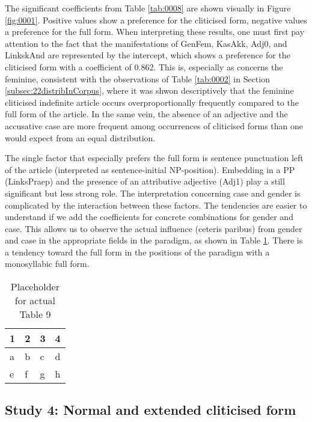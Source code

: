 The significant coefficients from Table \ref{tab:0008} are shown visually in Figure \ref{fig:0001}. 
Positive values show a preference for the cliticised form, negative values a preference for the full form.
When interpreting these results, one must first pay attention to the fact that the manifestations of GenFem, KasAkk, Adj0, and LinkskAnd are represented by the intercept, which shows a preference for the cliticised form with a coefficient of 0.862.
This is, especially as concerns the feminine, consistent with the observations of Table \ref{tab:0002} in Section \ref{subsec:22distribInCorpus}, where it was shwon descriptively that the feminine cliticised indefinite article occurs overproportionally frequently compared to the full form of the article.
In the same vein, the absence of an adjective and the accusative case are more frequent among occurrences of cliticised forms than one would expect from an equal distribution.

The single factor that especially prefers the full form is sentence punctuation left of the article (interpreted as sentence-initial NP-position). 
Embedding in a PP (LinksPraep) and the presence of an attributive adjective (Adj1) play a still significant but less strong role. 
The interpretation concerning case and gender is complicated by the interaction between these factors.
The tendencies are easier to understand if we add the coefficients for concrete combinations for gender and case.
This allows us to observe the actual influence (ceteris paribus) from gender and case in the appropriate fields in the paradigm, as shown in Table \ref{tab:0009}.
There is a tendency toward the full form in the positions of the paradigm with a monosyllabic full form.

\begin{table}
	\centering
	\begin{tabular}{llll}
		\toprule
		\textbf{1} & \textbf{2} & \textbf{3} & \textbf{4} \\
		\midrule
		a & b & c & d \\
		e & f & g & h \\
		\bottomrule
	\end{tabular}
	\caption{Placeholder for actual Table 9}
	\label{tab:0009}
\end{table}

\subsection{Study 4: Normal and extended cliticised form}
\label{subsec:26s4NormExtendedCliticForm}

